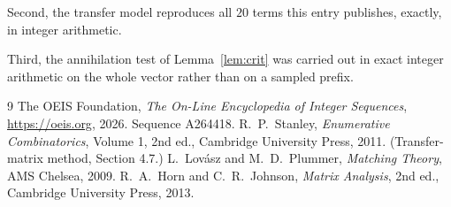 \documentclass[11pt,a4paper]{article}
\theoremstyle{plain}
\theoremstyle{definition}
\begin{document}
Second, the transfer model reproduces all $20$ terms this entry publishes, exactly, in
integer arithmetic.

Third, the annihilation test of Lemma~\ref{lem:crit} was carried out in exact integer
arithmetic on the whole vector rather than on a sampled prefix.

\begin{thebibliography}{9}
 The OEIS Foundation, \emph{The On-Line Encyclopedia of Integer
Sequences}, \url{https://oeis.org}, 2026. Sequence A264418.
 R.~P.~Stanley, \emph{Enumerative Combinatorics}, Volume 1, 2nd ed.,
Cambridge University Press, 2011. (Transfer-matrix method, Section 4.7.)
 L.~Lov\'asz and M.~D.~Plummer, \emph{Matching Theory}, AMS Chelsea, 2009.
 R.~A.~Horn and C.~R.~Johnson, \emph{Matrix Analysis}, 2nd ed., Cambridge
University Press, 2013.
\end{thebibliography}
\end{document}
